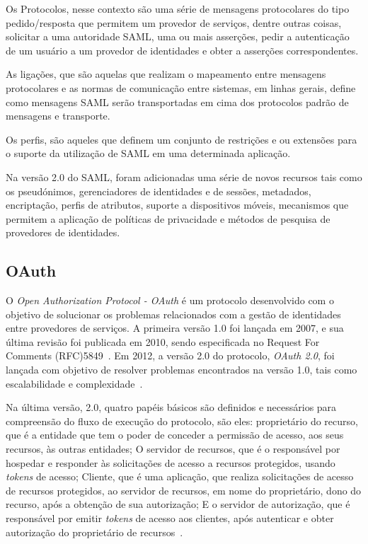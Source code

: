 Os Protocolos, nesse contexto são uma série de mensagens protocolares do tipo pedido/resposta que permitem um provedor de serviços, dentre outras coisas, solicitar a uma autoridade SAML, uma ou mais asserções, pedir a autenticação de um usuário a um provedor de identidades e obter a asserções correspondentes.

As ligações, que são aquelas que realizam o mapeamento entre mensagens protocolares e as normas de comunicação entre sistemas, em linhas gerais, define como mensagens SAML serão transportadas em cima dos protocolos padrão de mensagens e transporte.

Os perfis, são aqueles que definem um conjunto de restrições e ou extensões para o suporte da utilização de SAML em uma determinada aplicação.

Na versão 2.0 do SAML, foram adicionadas uma série de novos recursos tais como os pseudónimos, gerenciadores de identidades e de sessões, metadados, encriptação, perfis de atributos, suporte a dispositivos móveis, mecanismos que permitem a aplicação de políticas de privacidade e métodos de pesquisa de provedores de identidades.

\subsection{OAuth}

O \emph{Open Authorization Protocol - OAuth} é um protocolo desenvolvido com o objetivo de solucionar os problemas relacionados com a gestão de identidades entre provedores de serviços. A primeira versão 1.0 foi lançada em 2007, e sua última revisão foi publicada em 2010, sendo especificada no Request For Comments (RFC)5849~\cite{oauth210}. Em 2012, a versão 2.0 do protocolo, \emph{OAuth 2.0}, foi lançada com objetivo de resolver problemas encontrados na versão 1.0, tais como escalabilidade e complexidade~\cite{rfc6749}.

Na última versão, 2.0, quatro papéis básicos são definidos e necessários para compreensão do fluxo de execução do protocolo, são eles: proprietário do recurso, que é a entidade que tem o poder de conceder a permissão de acesso, aos seus recursos, às outras entidades; O servidor de recursos, que é o responsável por hospedar e responder às solicitações de acesso a recursos protegidos, usando \emph{tokens} de acesso; Cliente, que é uma aplicação, que realiza solicitações de acesso de recursos protegidos, ao servidor de recursos, em nome do proprietário, dono do recurso, após a obtenção de sua autorização; E o servidor de autorização, que é responsável por emitir \emph{tokens} de acesso aos clientes, após autenticar e obter autorização do proprietário de recursos~\cite{rfc6749}.

